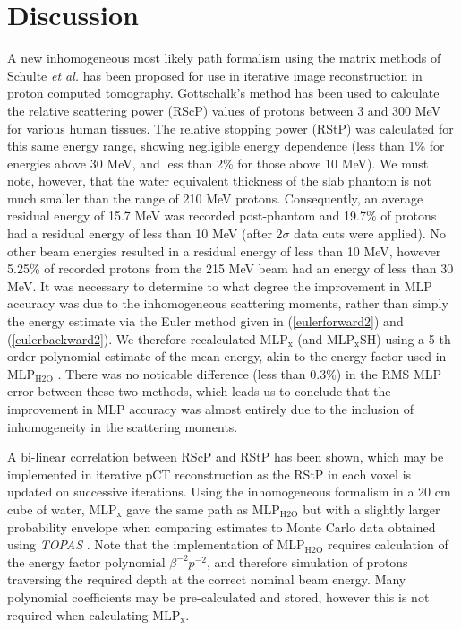 \documentclass[preprint,times]{elsarticle}
\newcommand{\Eqn}[1]{(#1)} %
\begin{document}
\section{Discussion}\label{discussionsec}

A new inhomogeneous most likely path formalism using the matrix methods of Schulte \emph{et al.} \citep{penfoldMLP} has been proposed for use in iterative image reconstruction in proton computed tomography. Gottschalk's method \citep{gottschalkRadioProtons} has been used to calculate the relative scattering power (RScP) values of protons between 3 and 300 MeV for various human tissues. The relative stopping power (RStP) was calculated for this same energy range, showing negligible energy dependence (less than 1\% for energies above 30 MeV, and less than 2\% for those above 10 MeV). We must note, however, that the water equivalent thickness of the slab phantom is not much smaller than the range of 210 MeV protons. Consequently, an average residual energy of 15.7 MeV was recorded post-phantom and 19.7\% of protons had a residual energy of less than 10 MeV (after 2$\sigma$ data cuts were applied). No other beam energies resulted in a residual energy of less than 10 MeV, however 5.25\% of recorded protons from the 215 MeV beam had an energy of less than 30 MeV. It was necessary to determine to what degree the improvement in MLP accuracy was due to the inhomogeneous scattering moments, rather than simply the energy estimate via the Euler method given in \Eqn{\ref{eulerforward2}} and \Eqn{\ref{eulerbackward2}}. We therefore recalculated MLP$_\mathrm{x}$ (and MLP$_\mathrm{x}$SH) using a 5-th order polynomial estimate of the mean energy, akin to the energy factor used in MLP$_\mathrm{H2O}$ \citep{penfoldMLP}. There was no noticable difference (less than 0.3\%) in the RMS MLP error between these two methods, which leads us to conclude that the improvement in MLP accuracy was almost entirely due to the inclusion of inhomogeneity in the scattering moments.

A bi-linear correlation between RScP and RStP has been shown, which may be implemented in iterative pCT reconstruction as the RStP in each voxel is updated on successive iterations. Using the inhomogeneous formalism in a 20 cm cube of water, MLP$_\mathrm{x}$ gave the same path as MLP$_\mathrm{H2O}$ but with a slightly larger probability envelope when comparing estimates to Monte Carlo data obtained using \emph{TOPAS} \citep{TOPAS}. Note that the implementation of MLP$_\mathrm{H2O}$ requires calculation of the energy factor polynomial $\beta^{-2} p^{-2}$, and therefore simulation of protons traversing the required depth at the correct nominal beam energy. Many polynomial coefficients may be pre-calculated and stored, however this is not required when calculating MLP$_\mathrm{x}$.
\end{document}
